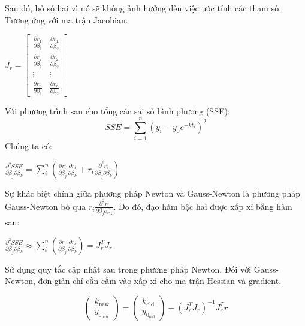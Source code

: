 \documentclass[conference]{IEEEtran}
\begin{document}
Sau đó, bỏ số hai vì nó sẽ không ảnh hưởng đến việc ước tính các tham số. Tương ứng với ma trận Jacobian.

\begin{center}
    \(
    J_r = \begin{bmatrix}
        \frac{\partial r_1}{\partial \beta_1} & \frac{\partial r_1}{\partial \beta_2} \\
        \frac{\partial r_2}{\partial \beta_1} & \frac{\partial r_2}{\partial \beta_2} \\
        \vdots                                & \vdots                                \\
        \frac{\partial r_n}{\partial \beta_1} & \frac{\partial r_n}{\partial \beta_2}
    \end{bmatrix}
    \)
\end{center}

Với phương trình sau cho tổng các sai số bình phương (SSE):
\[
    SSE = \sum_{i=1}^{n} (y_i - y_0 e^{-kt_i})^2
\]
Chúng ta có:
\begin{center}
    \(
    \frac{\partial^2 {SSE}}{\partial \beta_j \partial \beta_k} = \sum_{i}^{n} \left( \frac{\partial r_i}{\partial \beta_j} \frac{\partial r_i}{\partial \beta_k} + r_i \frac{\partial^2 r_i}{\partial \beta_j \partial \beta_k} \right)
    \)
\end{center}

Sự khác biệt chính giữa phương pháp Newton và Gauss-Newton là phương pháp Gauss-Newton bỏ qua \(r_i \frac{\partial^2 r_i}{\partial \beta_j \partial \beta_k}\).
Do đó, đạo hàm bậc hai được xấp xỉ bằng hàm sau:
\begin{center}
    \(
    \frac{\partial^2 {SSE}}{\partial \beta_j \partial \beta_k} \approx \sum_{i}^{n} \left( \frac{\partial r_i}{\partial \beta_j} \frac{\partial r_i}{\partial \beta_k} \right) = J^T_r J_r
    \)
\end{center}

Sử dụng quy tắc cập nhật sau trong phương pháp Newton. Đối với Gauss-Newton, đơn giản chỉ cần cắm vào xấp xỉ cho ma trận Hessian và gradient.

\begin{center}
    \[
        \begin{pmatrix}
            k_{\text{new}} \\ y_{0_\text{new}}
        \end{pmatrix} =
        \begin{pmatrix}
            k_{\text{old}} \\ y_{0_\text{old}}
        \end{pmatrix} - (J^T_r J_r)^{-1} J^T_r r
    \]
\end{center}
\end{document}
